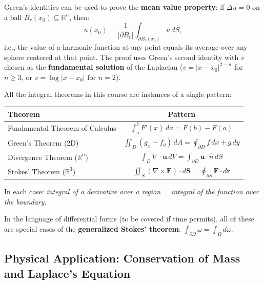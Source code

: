 \documentclass[11pt]{report}
\newcommand{\R}{\mathbb{R}}
\begin{document}
\begin{example}
Green's identities can be used to prove the \textbf{mean value property}: if $\Delta u = 0$ on a ball $B_r(x_0) \subseteq \R^n$, then:
\[
u(x_0) = \frac{1}{|\partial B_r|} \int_{\partial B_r(x_0)} u \, dS,
\]
i.e., the value of a harmonic function at any point equals its average over any sphere centered at that point. The proof uses Green's second identity with $v$ chosen as the \textbf{fundamental solution} of the Laplacian ($v = |x - x_0|^{2-n}$ for $n \geq 3$, or $v = \log |x - x_0|$ for $n = 2$).
\end{example}

\begin{remark}
All the integral theorems in this course are instances of a single pattern:

\begin{center}
\renewcommand{\arraystretch}{1.5}
\begin{tabular}{|l|c|}
\hline
\textbf{Theorem} & \textbf{Pattern} \\
\hline
Fundamental Theorem of Calculus & $\int_a^b F'(x) \, dx = F(b) - F(a)$ \\
\hline
Green's Theorem (2D) & $\iint_D (g_x - f_y) \, dA = \oint_{\partial D} f \, dx + g \, dy$ \\
\hline
Divergence Theorem ($\R^n$) & $\int_D \nabla \cdot \mathbf{u} \, dV = \int_{\partial D} \mathbf{u} \cdot \hat{n} \, dS$ \\
\hline
Stokes' Theorem ($\R^3$) & $\iint_S (\nabla \times \mathbf{F}) \cdot d\mathbf{S} = \oint_{\partial S} \mathbf{F} \cdot d\mathbf{r}$ \\
\hline
\end{tabular}
\end{center}

In each case: \textit{integral of a derivative over a region = integral of the function over the boundary}.

In the language of differential forms (to be covered if time permits), all of these are special cases of the \textbf{generalized Stokes' theorem}: $\displaystyle\int_{\partial \Omega} \omega = \int_\Omega d\omega$.
\end{remark}

\subsection{Physical Application: Conservation of Mass and Laplace's Equation}
\end{document}
